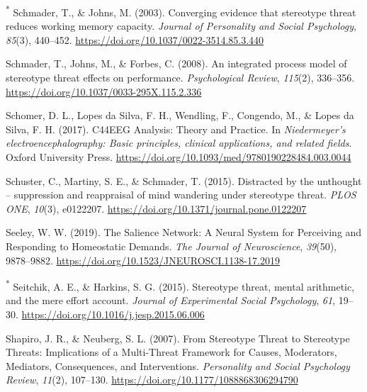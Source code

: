 \documentclass[
  stu, a4paper, 12pt,mask,floatsintext]{apa7}
\newlength{\cslhangindent}
\newenvironment{CSLReferences}[2] %
 {\begin{list}{}{%
  \setlength{\itemindent}{0pt}
  \setlength{\leftmargin}{0pt}
  \setlength{\parsep}{0pt}
  \ifodd #1
   \setlength{\leftmargin}{\cslhangindent}
   \setlength{\itemindent}{-1\cslhangindent}
  \fi
  \setlength{\itemsep}{#2\baselineskip}}}
 {\end{list}}
\begin{document}
\begin{CSLReferences}{1}{0}
\textsuperscript{*} Schmader, T., \& Johns, M. (2003). Converging evidence that stereotype threat reduces working memory capacity. \emph{Journal of Personality and Social Psychology}, \emph{85}(3), 440--452. \url{https://doi.org/10.1037/0022-3514.85.3.440}

Schmader, T., Johns, M., \& Forbes, C. (2008). An integrated process model of stereotype threat effects on performance. \emph{Psychological Review}, \emph{115}(2), 336--356. \url{https://doi.org/10.1037/0033-295X.115.2.336}

Schomer, D. L., Lopes da Silva, F. H., Wendling, F., Congendo, M., \& Lopes da Silva, F. H. (2017). {C44EEG Analysis}: {Theory} and {Practice}. In \emph{Niedermeyer's electroencephalography: {Basic} principles, clinical applications, and related fields}. Oxford University Press. \url{https://doi.org/10.1093/med/9780190228484.003.0044}

Schuster, C., Martiny, S. E., \& Schmader, T. (2015). Distracted by the unthought -- suppression and reappraisal of mind wandering under stereotype threat. \emph{PLOS ONE}, \emph{10}(3), e0122207. \url{https://doi.org/10.1371/journal.pone.0122207}

Seeley, W. W. (2019). The {Salience Network}: {A Neural System} for {Perceiving} and {Responding} to {Homeostatic Demands}. \emph{The Journal of Neuroscience}, \emph{39}(50), 9878--9882. \url{https://doi.org/10.1523/JNEUROSCI.1138-17.2019}

\textsuperscript{*} Seitchik, A. E., \& Harkins, S. G. (2015). Stereotype threat, mental arithmetic, and the mere effort account. \emph{Journal of Experimental Social Psychology}, \emph{61}, 19--30. \url{https://doi.org/10.1016/j.jesp.2015.06.006}

Shapiro, J. R., \& Neuberg, S. L. (2007). From {Stereotype Threat} to {Stereotype Threats}: {Implications} of a {Multi-Threat Framework} for {Causes}, {Moderators}, {Mediators}, {Consequences}, and {Interventions}. \emph{Personality and Social Psychology Review}, \emph{11}(2), 107--130. \url{https://doi.org/10.1177/1088868306294790}


\end{CSLReferences}
\end{document}

